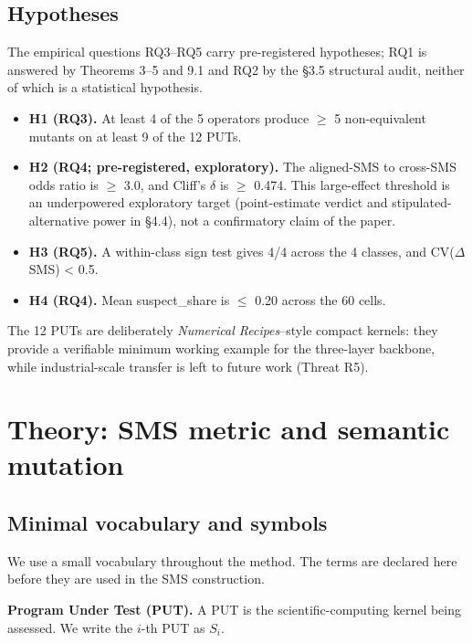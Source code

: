 \documentclass[manuscript,screen,review]{acmart}
\begin{document}
\subsection{Hypotheses}\label{hypotheses}

The empirical questions RQ3--RQ5 carry pre-registered hypotheses; RQ1 is
answered by Theorems 3--5 and 9.1 and RQ2 by the §3.5 structural audit,
neither of which is a statistical hypothesis.

\begin{itemize}

\item
  \textbf{H1 (RQ3).} At least 4 of the 5 operators produce $\geq$ 5 non-equivalent
  mutants on at least 9 of the 12 PUTs.
\item
  \textbf{H2 (RQ4; pre-registered, exploratory).} The aligned-SMS to
  cross-SMS odds ratio is $\geq$ 3.0, and Cliff's $\delta$ is $\geq$ 0.474.
  This large-effect threshold is an underpowered exploratory target
  (point-estimate verdict and stipulated-alternative power in §4.4), not
  a confirmatory claim of the paper.
\item
  \textbf{H3 (RQ5).} A within-class sign test gives 4/4 across the 4 classes,
  and CV($\Delta$SMS) \textless{} 0.5.
\item
  \textbf{H4 (RQ4).} Mean suspect\_share is $\leq$ 0.20 across the 60 cells.
\end{itemize}

The 12 PUTs are deliberately \emph{Numerical Recipes}--style compact
kernels: they provide a verifiable minimum working example for the
three-layer backbone, while industrial-scale transfer is left to future
work (Threat R5).


\section{Theory: SMS metric and semantic mutation}\label{notation-and-equivalence-judgement}

\subsection{Minimal vocabulary and symbols}\label{vocabulary-inheritance}

We use a small vocabulary throughout the method. The terms are declared
here before they are used in the SMS construction.

\textbf{Program Under Test (PUT).} A PUT is the scientific-computing
kernel being assessed. We write the \(i\)-th PUT as \(S_i\).
\end{document}
